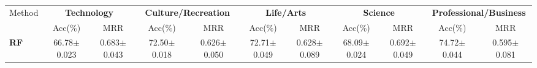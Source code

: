  \begin{table}[h]
   \centering
     \setlength{\tabcolsep}{0.5pt}
   \begin{threeparttable}
  \begin{tabular}{l|c c|c c|c c|c c|c c}
     \toprule
     \multirow{2}{*}{Method} &
        \multicolumn{2}{c}{\textbf{Technology}} &
       \multicolumn{2}{c}{\textbf{Culture/Recreation}} &
       \multicolumn{2}{c}{\textbf{Life/Arts}} &
       \multicolumn{2}{c}{\textbf{Science}} &
       \multicolumn{2}{c}{\textbf{Professional/Business}}\\
       &{Acc(\%)} & {MRR}&{Acc(\%)} & {MRR}&{Acc(\%)}& {MRR}&{Acc(\%)} & {MRR}&{Acc(\%)} & {MRR}\\
       \midrule
     \textbf{RF~\cite{BurelMA16,TianZL13}} & 66.78$\pm$0.023 & 0.683$\pm$0.043 & 72.50$\pm$0.018 & 0.626$\pm$0.050 & 72.71$\pm$0.049 & 0.628$\pm$0.089 & 68.09$\pm$0.024 & 0.692$\pm$0.049 & 74.72$\pm$0.044 & 0.595$\pm$0.081\\



\end{tabular}
\end{threeparttable}
\end{table}
